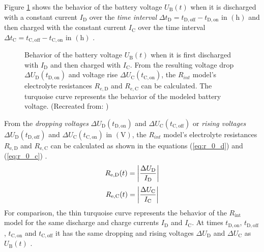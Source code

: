 Figure \ref{fig:tikz_pc_pd_battery_curve} shows the behavior of the battery voltage $U_{\mathrm B}(t)$ when it is discharged with a constant current $I_{\mathrm D}$ over the \emph{time interval} $\Delta t_{\mathrm{D}} = t_\mathrm{D, off} - t_\mathrm{D, on}$ in $\left(\mathrm{h}\right)$ and then charged with the constant current $I_{\mathrm C}$ over the time interval $\Delta t_{\mathrm{C}} = t_\mathrm{C, off} - t_\mathrm{C, on}$ in $\left(\mathrm{h}\right)$ \cite{Rahmoun:2012, Hentunen:2014, Li:2018, Kurzweil:2018, Gurjer:2019, Saldana:2019, Hossain:2019}.
\begin{figure}[h!]
	\centering
	
	\caption{Behavior of the battery voltage $U_{\mathrm B}(t)$ when it is first discharged with $I_{\mathrm D}$ and then charged with $I_{\mathrm C}$. From the resulting voltage drop $\Delta U_{\mathrm D}(t_\mathrm{D, on})$ and voltage rise $\Delta U_{\mathrm C}(t_\mathrm{C, on})$, the $R_{int}$ model's electrolyte resistances $R_{e,\mathrm{D}}$ and $R_{e,\mathrm{C}}$ can be calculated. The turquoise curve represents the behavior of the modeled battery voltage. (Recreated from: \cite{Rahmoun:2012, Hentunen:2014, Li:2018, Kurzweil:2018, Gurjer:2019, Saldana:2019, Hossain:2019})}
	\label{fig:tikz_pc_pd_battery_curve}
\end{figure}
From the \emph{dropping voltages} $\Delta U_{\mathrm D}(t_\mathrm{D, on})$ and $\Delta U_{\mathrm C}(t_\mathrm{C, off})$ or \emph{rising voltages} $\Delta U_{\mathrm D}(t_\mathrm{D, off})$ and $\Delta U_{\mathrm C}(t_\mathrm{C, on})$ in $\left( \mathrm{V} \right)$, the $R_{int}$ model's electrolyte resistances $R_{\mathrm{e,D}}$ and $R_{\mathrm{e,C}}$ can be calculated as shown in the equations (\ref{eq:r_0_d}) and (\ref{eq:r_0_c}) \cite{Rahmoun:2012, Hentunen:2014, Kurzweil:2018, Gurjer:2019}. 
\begin{equation}\label{eq:r_0_d}
	\centering
	R_{\mathrm{e,D}}(t) = \left|\dfrac{\Delta U_{\mathrm D}}{I_{\mathrm D}}\right|
\end{equation}
\begin{equation}\label{eq:r_0_c}
	\centering
	R_{\mathrm{e,C}}(t) = \left|\dfrac{\Delta U_{\mathrm C}}{I_{\mathrm C}}\right|
\end{equation}
For comparison, the thin turquoise curve represents the behavior of the $R_\mathrm{int}$ model for the same discharge and charge currents $I_{\mathrm D}$ and $I_{\mathrm C}$. At times $t_\mathrm{D, on}$, $t_\mathrm{D, off}$, $t_\mathrm{C, on}$ and $t_\mathrm{C, off}$ it has the same dropping and rising voltages $\Delta U_{\mathrm D}$ and $\Delta U_{\mathrm C}$ as $U_{\mathrm B}(t)$ \cite{Saldana:2019}.

